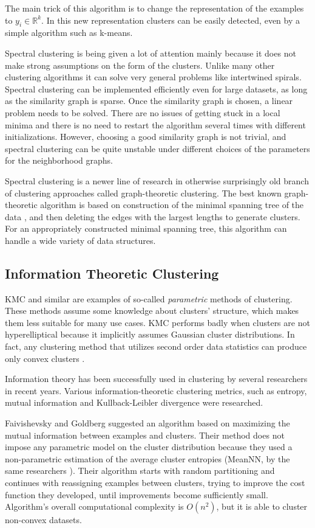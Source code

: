 \documentclass[conference]{IEEEtran}
\begin{document}
The main trick of this algorithm is to change the representation of the examples to $y_i \in \mathbb{R}^k$.
In this new representation clusters can be easily detected, even by a simple algorithm such as k-means.

Spectral clustering is being given a lot of attention mainly because it does not make strong
assumptions on the form of the clusters. Unlike many other clustering algorithms it
can solve very general problems like intertwined spirals.
Spectral clustering can be implemented efficiently even for large datasets, as long as
the similarity graph is sparse. Once the similarity graph is chosen, a linear problem needs to
be solved. There are no issues of getting stuck in a local minima and there is no need to
restart the algorithm several times with different initializations. However, choosing
a good similarity graph is not trivial, and spectral clustering can
be quite unstable under different choices of the parameters for the neighborhood graphs.

Spectral clustering is a newer line of research in otherwise surprisingly old branch of clustering
approaches called graph-theoretic clustering. The best known graph-theoretic algorithm is
based on construction of the minimal spanning tree of the data \cite{zahn71}, and then deleting
the edges with the largest lengths to generate clusters. For an appropriately constructed minimal
spanning tree, this algorithm can handle a wide variety of data structures.

\subsection{Information Theoretic Clustering}%
KMC and similar are examples of so-called \textit{parametric} methods of clustering. These
methods assume some knowledge about clusters' structure, which makes them less
suitable for many use cases. KMC performs badly when clusters are not hyperelliptical
because it implicitly assumes Gaussian cluster distributions. In fact, any clustering method
that utilizes second order data statistics can produce only convex clusters \cite{jain00}.

Information theory has been successfully used in clustering by several researchers in recent years.
Various information-theoretic clustering metrics, such as entropy, mutual information and
Kullback-Leibler divergence were researched.

Faivishevsky and Goldberg \cite{faivishevsky10} suggested an algorithm based on maximizing the mutual information
between examples and clusters. Their method does not impose any parametric model on the cluster
distribution because they used a non-parametric estimation of the average cluster entropies (MeanNN,
by the same researchers \cite{faivishevsky09}). Their algorithm starts with random partitioning and continues
with reassigning examples between clusters, trying to improve the cost function they developed,
until improvements become sufficiently small. Algorithm's overall computational complexity is
$O(n^2)$, but it is able to cluster non-convex datasets.
\end{document}
